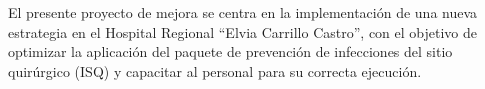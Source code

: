 	El presente proyecto de mejora se centra en la implementación de una nueva estrategia en el Hospital Regional ``Elvia Carrillo Castro'', con el objetivo de optimizar la aplicación del paquete de prevención de infecciones del sitio quirúrgico (ISQ) y capacitar al personal para su correcta ejecución.